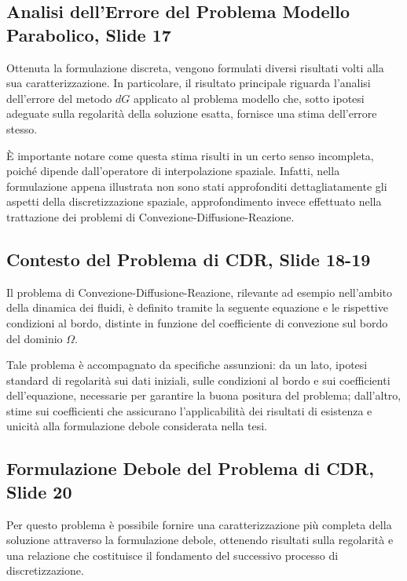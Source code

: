 \documentclass[12pt]{article}
\begin{document}
    \subsection{Analisi dell'Errore del Problema Modello Parabolico, Slide 17}

    Ottenuta la formulazione discreta, vengono formulati diversi risultati volti alla sua caratterizzazione. In particolare, il risultato principale riguarda l'analisi dell'errore del metodo $dG$ applicato al problema modello che, sotto ipotesi adeguate sulla regolarità della soluzione esatta, fornisce una stima dell'errore stesso.

    È importante notare come questa stima risulti in un certo senso incompleta, poiché dipende dall'operatore di interpolazione spaziale. Infatti, nella formulazione appena illustrata non sono stati approfonditi dettagliatamente gli aspetti della discretizzazione spaziale, approfondimento invece effettuato nella trattazione dei problemi di Convezione-Diffusione-Reazione.

    \subsection{Contesto del Problema di CDR, Slide 18-19}

    Il problema di Convezione-Diffusione-Reazione, rilevante ad esempio nell'ambito della dinamica dei fluidi, è definito tramite la seguente equazione e le rispettive condizioni al bordo, distinte in funzione del coefficiente di convezione sul bordo del dominio $\Omega$.

    Tale problema è accompagnato da specifiche assunzioni: da un lato, ipotesi standard di regolarità sui dati iniziali, sulle condizioni al bordo e sui coefficienti dell'equazione, necessarie per garantire la buona positura del problema; dall'altro, stime sui coefficienti che assicurano l'applicabilità dei risultati di esistenza e unicità alla formulazione debole considerata nella tesi.

    \subsection{Formulazione Debole del Problema di CDR, Slide 20}

    Per questo problema è possibile fornire una caratterizzazione più completa della soluzione attraverso la formulazione debole, ottenendo risultati sulla regolarità e una relazione che costituisce il fondamento del successivo processo di discretizzazione.
\end{document}

